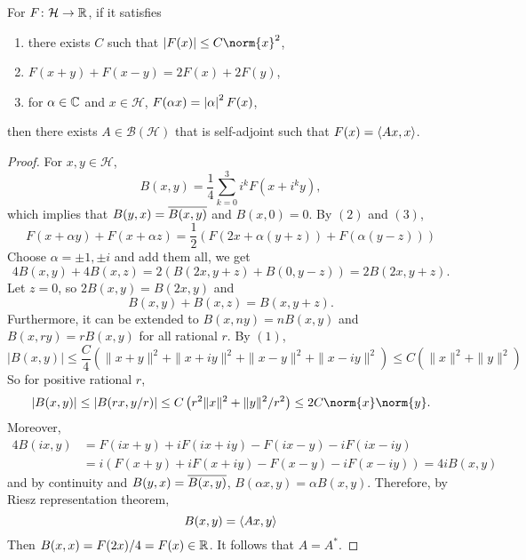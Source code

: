 \documentclass[a4paper,12pt]{article}
\begin{document}
\begin{prop}
   For $F \colon \mathcal{H} \rightarrow \mathbb{R}$, if it satisfies
   \begin{enumerate}[label=(\arabic{*})]
       \item there exists $C$ such that $\abs{F(x)} \leq C\norm{x}^2$,
       \item $F(x+y) + F(x-y) = 2F(x)+2F(y)$,
       \item for $\alpha \in \mathbb{C}$ and $x \in \mathcal{H}$, $F(\alpha x) = \left\lvert\alpha\right\lvert^2F(x)$,
   \end{enumerate} 
   then there exists $A \in \mathcal{B}(\mathcal{H})$ that is self-adjoint such that $F(x) = \left\langle Ax,x \right\rangle$.
\end{prop}
\begin{proof}
    For $x,y \in \mathcal{H}$,
    \begin{equation*}
        B(x, y)=\frac{1}{4} \sum_{k=0}^3 i^k F\left(x+i^k y\right),
    \end{equation*}
    which implies that $B(y,x) = \overline{B(x,y)}$ and $B(x,0) = 0$. By $(2)$ and $(3)$,
    \begin{equation*}
        F(x+\alpha y)+F(x+\alpha z)=\frac{1}{2}(F(2 x+\alpha(y+z))+F(\alpha(y-z)))
    \end{equation*}
    Choose $\alpha = \pm 1,\pm i$ and add them all, we get
    \begin{equation*}
        4 B(x, y)+4 B(x, z)=2(B(2 x, y+z)+B(0, y-z))=2 B(2 x, y+z).
    \end{equation*}
    Let $z = 0$, so $2 B(x, y)=B(2 x, y)$ and 
    \begin{equation*}
        B(x,y) + B(x,z) = B(x,y+z).
    \end{equation*}
    Furthermore, it can be extended to $B(x,ny) = n B(x,y)$ and $B(x,ry) = rB(x,y)$ for all rational $r$. By $(1)$,
    \begin{equation*}
        |B(x, y)| \leq \frac{C}{4}\left(\|x+y\|^2+\|x+i y\|^2+\|x-y\|^2+\|x-i y\|^2\right) \leq C\left(\|x\|^2+\|y\|^2\right)
    \end{equation*}
    So for positive rational $r$,
    \begin{equation*}
        |B(x, y)| \leq|B(r x, y / r)| \leq C\left(r^2\|x\|^2+\|y\|^2 / r^2\right) \le 2C\norm{x}\norm{y}.
    \end{equation*}
    Moreover,
    \begin{equation*}
        \begin{aligned}
            4 B(i x, y) & =F(i x+y)+i F(i x+i y)-F(i x-y)-i F(i x-i y) \\
            & =i(F(x+y)+i F(x+i y)-F(x-y)-i F(x-i y))=4 i B(x, y)
        \end{aligned}
    \end{equation*}
    and by continuity and $B(y,x) = \overline{B(x,y)}$, $B(\alpha x, y) = \alpha B(x,y)$. Therefore, by Riesz representation theorem,
    \begin{equation*}
        B(x,y) = \left\langle Ax,y \right\rangle
    \end{equation*}
    Then $B(x,x) = F(2x)/4 = F(x) \in \mathbb{R}$. It follows that $A=A^*$.
\end{proof}
\end{document}
